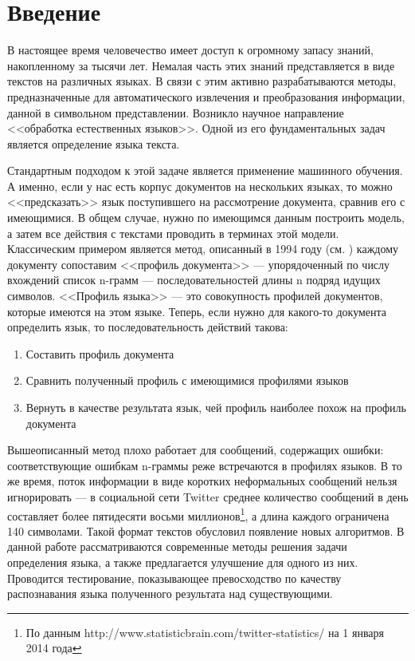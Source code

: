 \documentclass[a4paper, 14pt]{article}
\begin{document}
\pagebreak

\newtheorem{definition} {Определение}
\newtheorem{option} {Свойство}
\newtheorem{theorem} {Теорема}

\section*{Введение}

	        В настоящее время человечество имеет доступ к огромному запасу знаний, накопленному за тысячи лет. Немалая часть этих знаний представляется
	        в виде текстов на различных языках. В связи с этим активно разрабатываются методы, предназначенные для автоматического извлечения
	        и преобразования информации, данной в символьном представлении. 
	        Возникло научное направление <<обработка естественных языков>>. Одной из его фундаментальных задач является определение языка текста. 


	        Стандартным подходом к этой задаче является применение машинного обучения. А именно, если у нас есть корпус документов 
	        на нескольких языках, то можно <<предсказать>> язык поступившего на рассмотрение документа, сравнив его с имеющимися. 
	        В общем случае, нужно по имеющимся данным построить модель, а затем все действия с текстами проводить в терминах 
	        этой модели. 
	        Классическим примером является метод, описанный в 1994 году (см. \cite{canvar}) каждому документу сопоставим <<профиль документа>> --- упорядоченный по
	        числу вхождений список n-грамм --- последовательностей длины n подряд идущих символов. <<Профиль языка>> --- это совокупность профилей
	        документов, которые имеются на этом языке. Теперь, если нужно для какого-то документа определить язык, то последовательность
	        действий такова:
	        \begin{enumerate}
	        		\item Составить профиль документа
	        		\item Сравнить полученный профиль с имеющимися профилями языков
	        		\item Вернуть в качестве результата язык, чей профиль наиболее похож на профиль документа
	        \end{enumerate}
	          
	        Вышеописанный метод плохо работает для сообщений, содержащих ошибки: соответствующие ошибкам n-граммы реже встречаются в профилях языков. В то же время, поток информации в виде коротких неформальных сообщений нельзя игнорировать ---
	        в социальной сети Twitter среднее количество сообщений в день составляет более пятидесяти восьми миллионов\footnote{По данным http://www.statisticbrain.com/twitter-statistics/ на 1 января 2014 года}, а длина каждого ограничена 140 символами. 
	        Такой формат текстов обусловил появление новых алгоритмов. В данной работе рассматриваются современные методы 
	        решения задачи определения языка, а также предлагается улучшение для одного из них. Проводится тестирование, показывающее
	        превосходство по качеству распознавания языка полученного результата над существующими.
  
\end{document}
